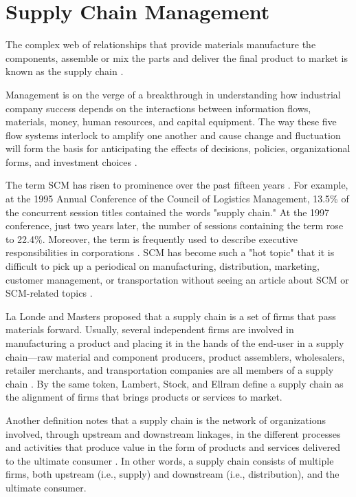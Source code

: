 \section{Supply Chain Management}\label{sec:scm}

The complex web of relationships that provide materials manufacture the components, assemble or mix the parts and deliver the final product to market is known as the supply chain \cite{buurman2002supply}.

Management is on the verge of a breakthrough in understanding how industrial company success depends on the interactions between information flows, materials, money, human resources, and capital equipment. The way these five flow systems interlock to amplify one another and cause change and fluctuation will form the basis for anticipating the effects of decisions, policies, organizational forms, and investment choices \cite{forrester1958industrial}.

The term \ac{SCM} has risen to prominence over the past fifteen years \cite{cooper1997supply}. For example, at the 1995 Annual Conference of the Council of Logistics Management, 13.5\% of the concurrent session titles contained the words "supply chain." At the 1997 conference, just two years later, the number of sessions containing the term rose to 22.4\%. Moreover, the term is frequently used to describe executive responsibilities in corporations \cite{la1997supply}. SCM has become such a "hot topic" that it is difficult to pick up a periodical on manufacturing, distribution, marketing, customer management, or transportation without seeing an article about SCM or SCM-related topics \cite{ross1997competing}.

La Londe and Masters proposed that a supply chain is a set of firms that pass materials forward. Usually, several independent firms are involved in manufacturing a product and placing it in the hands of the end-user in a supply chain—raw material and component producers, product assemblers, wholesalers, retailer merchants, and transportation companies are all members of a supply chain \cite{la1994emerging}. By the same token, Lambert, Stock, and Ellram define a supply chain as the alignment of firms that brings products or services to market. 

Another definition notes that a supply chain is the network of organizations involved, through upstream and downstream linkages, in the different processes and activities that produce value in the form of products and services delivered to the ultimate consumer \cite{christopher2017logistics}. In other words, a supply chain consists of multiple firms, both upstream (i.e., supply) and downstream
(i.e., distribution), and the ultimate consumer. 

